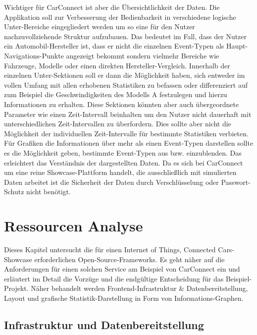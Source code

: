 \documentclass[12pt,a4paper,oneside, 
liststotoc, 					%
bibtotoc,						%
titlepage, 						%
headsepline, 					%
BCOR6mm,						%
openany,							%
]{scrreprt}
\begin{document}
Wichtiger für CarConnect ist aber die Übersichtlichkeit der Daten. Die Applikation soll zur Verbesserung der Bedienbarkeit in  verschiedene logische Unter-Bereiche eingegliedert werden um so eine für den Nutzer nachzuvollziehende Struktur aufzubauen. Das bedeutet im Fall, dass der Nutzer ein Automobil-Hersteller ist, dass er nicht die einzelnen Event-Typen als Haupt-Navigations-Punkte angezeigt bekommt sondern vielmehr Bereiche wie Fahrzeuge, Modelle oder einen direkten Hersteller-Vergleich. Innerhalb der einzelnen Unter-Sektionen soll er dann die Möglichkeit haben, sich entweder im vollen Umfang mit allen erhobenen Statistiken zu befassen oder differenziert auf zum Beispiel die Geschwindigkeiten des Modells A festzulegen und hierzu Informationen zu erhalten. Diese Sektionen könnten aber auch übergeordnete Parameter wie einen Zeit-Intervall beinhalten um den Nutzer nicht dauerhaft mit unterschiedlichen Zeit-Intervallen zu überfordern. Dies sollte aber nicht die Möglichkeit der individuellen Zeit-Intervalle für bestimmte Statistiken verbieten.
Für Grafiken die Informationen über mehr als einen Event-Typen darstellen sollte es die Möglichkeit geben, bestimmte Event-Typen aus bzw. einzublenden. Das erleichtert das Verständnis der dargestellten Daten.
Da es sich bei CarConnect um eine reine Showcase-Plattform handelt, die ausschließlich mit simulierten Daten arbeitet ist die Sicherheit der Daten durch Verschlüsselung oder Passwort-Schutz nicht benötigt.
\chapter{Ressourcen Analyse}\label{ressourcen}
Dieses Kapitel untersucht die für einen Internet of Things, Connected Cars-Showcase erforderlichen Open-Source-Frameworks. Es geht näher auf die Anforderungen für einen solchen Service am Beispiel von CarConnect ein und erläutert im Detail die Vorzüge und die endgültige Entscheidung für das Beispiel-Projekt. Näher behandelt werden Frontend-Infrastruktur \& Datenbereitstellung, Layout und grafische Statistik-Darstellung in Form von Informations-Graphen.
 \section{Infrastruktur und Datenbereitstellung}\label{ressourcen_infrastructure}
\end{document}
